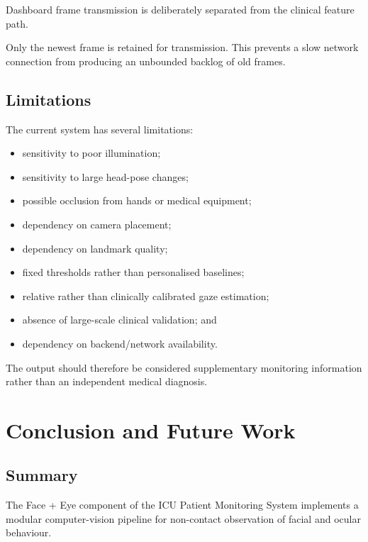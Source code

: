 \documentclass{tietreport}
\begin{document}
Dashboard frame transmission is deliberately separated from the
clinical feature path.

Only the newest frame is retained for transmission. This prevents a
slow network connection from producing an unbounded backlog of old
frames.


\section{Limitations}

The current system has several limitations:

\begin{itemize}
    \item sensitivity to poor illumination;
    \item sensitivity to large head-pose changes;
    \item possible occlusion from hands or medical equipment;
    \item dependency on camera placement;
    \item dependency on landmark quality;
    \item fixed thresholds rather than personalised baselines;
    \item relative rather than clinically calibrated gaze estimation;
    \item absence of large-scale clinical validation; and
    \item dependency on backend/network availability.
\end{itemize}

The output should therefore be considered supplementary monitoring
information rather than an independent medical diagnosis.


\chapter{Conclusion and Future Work}

\section{Summary}

The Face + Eye component of the ICU Patient Monitoring System
implements a modular computer-vision pipeline for non-contact
observation of facial and ocular behaviour.
\end{document}
